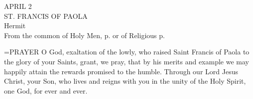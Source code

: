 \begin{center}\normalsize APRIL 2\\
\footnotesize ST. FRANCIS OF PAOLA\\
\footnotesize Hermit\\
\footnotesize From the common of Holy Men, p.     or of Religious p. \\
\end{center}

\hangindent=\parindent \small{PRAYER 
O God, exaltation of the lowly,
who raised Saint Francis of Paola to the glory of your Saints,
grant, we pray, that by his merits and example
we may happily attain the rewards promised to the humble.
Through our Lord Jesus Christ, your Son,
who lives and reigns with you in the unity of the Holy Spirit,
one God, for ever and ever.\\}
 
